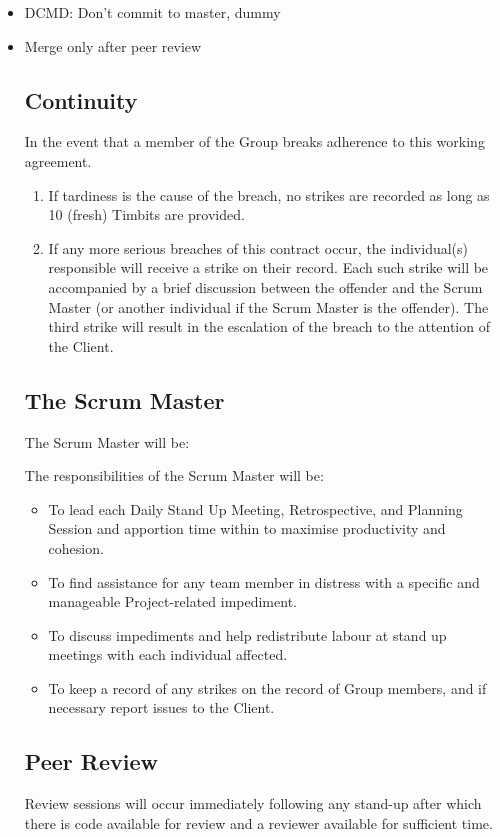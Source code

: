 \documentclass[a4paper,12pt]{article} %
\begin{document}
\begin{itemize}
\item DCMD: Don't commit to master, dummy
\item Merge only after peer review

\subsection{Continuity}

In the event that a member of the Group breaks adherence to this working agreement. 
\begin{enumerate}
	\item If tardiness is the cause of the breach, no strikes are recorded as long as 10 (fresh) Timbits are provided.
	\item If any more serious breaches of this contract occur, the individual(s) responsible will receive a strike on their record. Each such strike will be accompanied by a brief discussion between the offender and the Scrum Master (or another individual if the Scrum Master is the offender). The third strike will result in the escalation of the breach to the attention of the Client.
\end{enumerate}

\subsection{The Scrum Master}
The Scrum Master will be: 

The responsibilities of the Scrum Master will be:
\begin{itemize}
\item To lead each Daily Stand Up Meeting, Retrospective, and Planning Session and apportion time within to maximise productivity and cohesion.

\item To find assistance for any team member in distress with a specific and manageable Project-related impediment.

\item To discuss impediments and help redistribute labour at stand up meetings with each individual affected.

\item To keep a record of any strikes on the record of Group members, and if necessary report issues to the Client.
\end{itemize}

\subsection{Peer Review}
Review sessions will occur immediately following any stand-up after which there is code available for review and a reviewer available for sufficient time.


\end{itemize}
\end{document}
